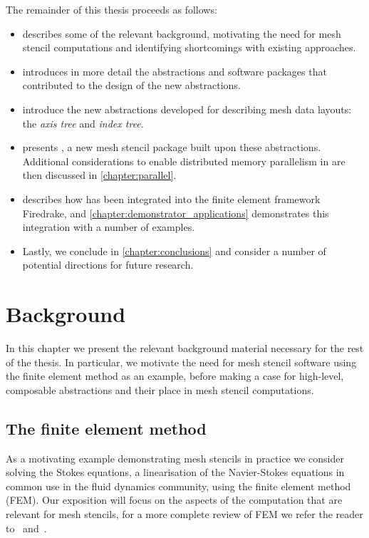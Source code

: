 \documentclass[thesis]{subfiles}
\begin{document}
The remainder of this thesis proceeds as follows:
\begin{itemize}
  \item
     describes some of the relevant background, motivating the need for mesh stencil computations and identifying shortcomings with existing approaches.
  \item
     introduces in more detail the abstractions and software packages that contributed to the design of the new abstractions.
  \item
     introduce the new abstractions developed for describing mesh data layouts: the \emph{axis tree} and \emph{index tree}.
  \item
     presents , a new mesh stencil package built upon these abstractions.
    Additional considerations to enable distributed memory parallelism in  are then discussed in \cref{chapter:parallel}.
  \item {} describes how  has been integrated into the finite element framework Firedrake, and \cref{chapter:demonstrator_applications} demonstrates this integration with a number of examples.
  \item Lastly, we conclude in \cref{chapter:conclusions} and consider a number of potential directions for future research.
\end{itemize}



\chapter{Background}
\label{chapter:background}

In this chapter we present the relevant background material necessary for the rest of the thesis.
In particular, we motivate the need for mesh stencil software using the finite element method as an example, before making a case for high-level, composable abstractions and their place in mesh stencil computations.

\section{The finite element method}
\label{sec:stokes_equations}

As a motivating example demonstrating mesh stencils in practice we consider solving the Stokes equations, a linearisation of the Navier-Stokes equations in common use in the fluid dynamics community, using the finite element method (FEM).
Our exposition will focus on the aspects of the computation that are relevant for mesh stencils, for a more complete review of FEM we refer the reader to~\cite{brennerMathematicalTheoryFinite2008} and~\cite{larsonFiniteElementMethod2013}.
\end{document}
